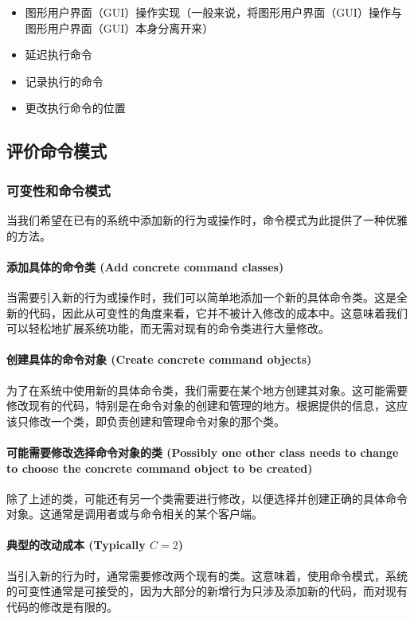\begin{itemize}
	\item 图形用户界面（GUI）操作实现（一般来说，将图形用户界面（GUI）操作与图形用户界面（GUI）本身分离开来）
	\item 延迟执行命令
	\item 记录执行的命令
	\item 更改执行命令的位置
\end{itemize}


\subsection{评价命令模式}
\subsubsection{可变性和命令模式}
当我们希望在已有的系统中添加新的行为或操作时，命令模式为此提供了一种优雅的方法。

\paragraph{添加具体的命令类 (Add concrete command classes)}当需要引入新的行为或操作时，我们可以简单地添加一个新的具体命令类。这是全新的代码，因此从可变性的角度来看，它并不被计入修改的成本中。这意味着我们可以轻松地扩展系统功能，而无需对现有的命令类进行大量修改。

\paragraph{创建具体的命令对象 (Create concrete command objects)}为了在系统中使用新的具体命令类，我们需要在某个地方创建其对象。这可能需要修改现有的代码，特别是在命令对象的创建和管理的地方。根据提供的信息，这应该只修改一个类，即负责创建和管理命令对象的那个类。

\paragraph{可能需要修改选择命令对象的类 (Possibly one other class needs to change to choose the concrete command object to be created)}
除了上述的类，可能还有另一个类需要进行修改，以便选择并创建正确的具体命令对象。这通常是调用者或与命令相关的某个客户端。

\paragraph{典型的改动成本 (Typically $C = 2$)}当引入新的行为时，通常需要修改两个现有的类。这意味着，使用命令模式，系统的可变性通常是可接受的，因为大部分的新增行为只涉及添加新的代码，而对现有代码的修改是有限的。

